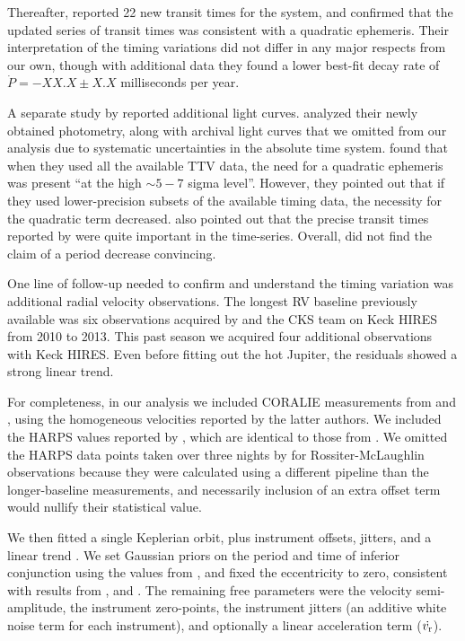 \documentclass[RNAAS]{aastex62}
\begin{document}
Thereafter, \citet{southworth_transit_2019} reported 22 new transit
times for the system, and confirmed that the updated series of transit
times was consistent with a quadratic ephemeris.  Their interpretation
of the timing variations did not differ in any major respects from our
own, though with additional data they found a lower best-fit decay
rate of $\dot{P} = -XX.X \pm X.X$ milliseconds per year.

A separate study by \citet{baluev_homogeneously_2019} reported
additional light curves. \citeauthor{baluev_homogeneously_2019}
analyzed their newly obtained photometry, along with archival light
curves that we omitted from our analysis due to systematic
uncertainties in the absolute time system.
\citeauthor{baluev_homogeneously_2019} found that when they used all
the available TTV data, the need for a quadratic ephemeris was present
``at the high $\sim 5-7$ sigma level''.  However, they pointed out
that if they used lower-precision subsets of the available timing
data, the necessity for the quadratic term decreased.
\citeauthor{baluev_homogeneously_2019} also pointed out that the
precise transit times reported by \citet{huitson_gemini_2017} were
quite important in the time-series.  Overall,
\citeauthor{baluev_homogeneously_2019} did not find the claim of a
period decrease convincing.

One line of follow-up needed to confirm and understand the timing
variation was additional radial velocity observations.  The longest RV
baseline previously available was six observations acquired by
\citet{knutson_friends_2014} and the CKS team on Keck HIRES from
2010 to 2013.  This past season we acquired four additional
observations with Keck HIRES. Even before fitting out the hot Jupiter,
the residuals showed a strong linear trend.

For completeness, in our analysis we included CORALIE measurements
from \citet{wilson_wasp-4b_2008} and \citet{triaud_spin-orbit_2010},
using the homogeneous velocities reported by the latter authors.  We
included the HARPS values reported by \citet{pont_determining_2011},
which are identical to those from \citet{husnoo_observational_2012}.
We omitted the HARPS data points taken over three nights by
\citet{triaud_spin-orbit_2010} for Rossiter-McLaughlin observations
because they were calculated using a different pipeline than the
longer-baseline \citeauthor{pont_determining_2011} measurements, and
necessarily inclusion of an extra offset term would nullify their
statistical value.

We then fitted a single Keplerian orbit, plus instrument offsets,
jitters, and a linear trend
\citep[][\texttt{radvel}]{fulton_radvel_2018}.  We set Gaussian priors
on the period and time of inferior conjunction using the values from
\citet{bouma_wasp-4b_2019}, and fixed the eccentricity to zero,
consistent with results from \citet{beerer_secondary_2011},
\citet{knutson_friends_2014} and \citet{bonomo_gaps_2017}.  The
remaining free parameters were the velocity semi-amplitude, the
instrument zero-points, the instrument jitters (an additive white
noise term for each instrument), and optionally a linear acceleration
term ($\dot{v_{\rm r}}$).
\end{document}
